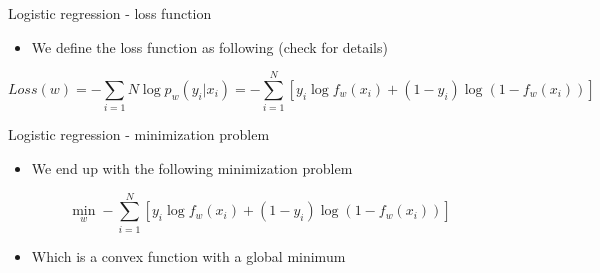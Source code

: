 \documentclass[aspectratio=169]{beamer}
\begin{document}
\begin{frame}{Logistic regression - loss function}
    \begin{itemize}
        \item We define the loss function as following (check \cite{Bishop, Murphy} for details)
    \end{itemize}

    $$
    Loss(w) = - \sum_{i=1}{N}\log p_w(y_i|x_i) = - \sum_{i=1}^{N}[y_i \log f_w(x_i) + (1 - y_i)\log (1-f_w(x_i))]
    $$
\end{frame}
\begin{frame}{Logistic regression - minimization problem}
    \begin{itemize}
        \item We end up with the following minimization problem
    \end{itemize}
    $$
    \min_w - \sum_{i=1}^{N}[y_i \log f_w(x_i) + (1 - y_i)\log (1-f_w(x_i))]
    $$
    \begin{itemize}
        \item Which is a convex function with a global minimum
    \end{itemize}
\end{frame}
\end{document}
